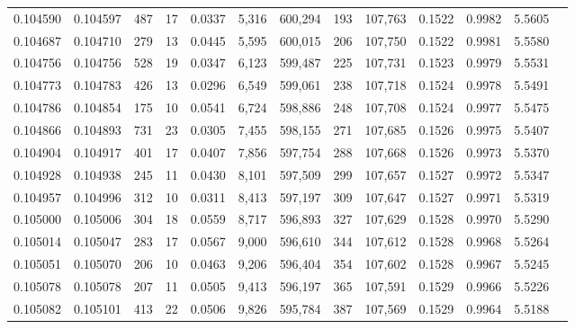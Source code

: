 \begin{tabular}{rrrrrrrrrrrrr}
0.104590 & 0.104597 &   487 &  17 &                                     0.0337 &   5,316 & 600,294 &     193 & 107,763 & 0.1522 & 0.9982 & 5.5605 \\
0.104687 & 0.104710 &   279 &  13 &                                     0.0445 &   5,595 & 600,015 &     206 & 107,750 & 0.1522 & 0.9981 & 5.5580 \\
0.104756 & 0.104756 &   528 &  19 &                                     0.0347 &   6,123 & 599,487 &     225 & 107,731 & 0.1523 & 0.9979 & 5.5531 \\
0.104773 & 0.104783 &   426 &  13 &                                     0.0296 &   6,549 & 599,061 &     238 & 107,718 & 0.1524 & 0.9978 & 5.5491 \\
0.104786 & 0.104854 &   175 &  10 &                                     0.0541 &   6,724 & 598,886 &     248 & 107,708 & 0.1524 & 0.9977 & 5.5475 \\
0.104866 & 0.104893 &   731 &  23 &                                     0.0305 &   7,455 & 598,155 &     271 & 107,685 & 0.1526 & 0.9975 & 5.5407 \\
0.104904 & 0.104917 &   401 &  17 &                                     0.0407 &   7,856 & 597,754 &     288 & 107,668 & 0.1526 & 0.9973 & 5.5370 \\
0.104928 & 0.104938 &   245 &  11 &                                     0.0430 &   8,101 & 597,509 &     299 & 107,657 & 0.1527 & 0.9972 & 5.5347 \\
0.104957 & 0.104996 &   312 &  10 &                                     0.0311 &   8,413 & 597,197 &     309 & 107,647 & 0.1527 & 0.9971 & 5.5319 \\
0.105000 & 0.105006 &   304 &  18 &                                     0.0559 &   8,717 & 596,893 &     327 & 107,629 & 0.1528 & 0.9970 & 5.5290 \\
0.105014 & 0.105047 &   283 &  17 &                                     0.0567 &   9,000 & 596,610 &     344 & 107,612 & 0.1528 & 0.9968 & 5.5264 \\
0.105051 & 0.105070 &   206 &  10 &                                     0.0463 &   9,206 & 596,404 &     354 & 107,602 & 0.1528 & 0.9967 & 5.5245 \\
0.105078 & 0.105078 &   207 &  11 &                                     0.0505 &   9,413 & 596,197 &     365 & 107,591 & 0.1529 & 0.9966 & 5.5226 \\
0.105082 & 0.105101 &   413 &  22 &                                     0.0506 &   9,826 & 595,784 &     387 & 107,569 & 0.1529 & 0.9964 & 5.5188 \\

\end{tabular}
